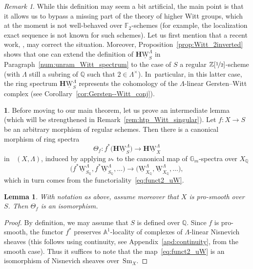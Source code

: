 \documentclass[11pt]{article}
\numberwithin{equation}{section}\renewcommand{\encodingdefault}{TU}
\renewcommand{\AA}{\mathbb A}
\newcommand{\uW}{\underline{\mathrm W}}
\newcommand{\HuW}{\mathbf H \underline{\mathrm W}}
\newcommand{\sm}{\mathrm{Sm}}
\DeclareMathOperator{\DA}{D_{\AA^1}}
\newcommand{\ZZot} {\mathbb Z[\nicefrac 1 2]}
\newcommand{\QQ} {\mathbb Q}
\newcommand{\GG} {\mathbb{G}_m}
\newtheorem{lm}[thm]{Lemma}
\theoremstyle{remark}
\newtheorem{rem}[thm]{Remark}
\theoremstyle{definition}
\newtheorem{num}[thm]{}
\numberwithin{equation}{thm}
\begin{document}
\begin{rem}\label{rem:justif_df_uW}
While this definition may seem a bit artificial, the main point is that it allows us to bypass a missing part of the theory of higher Witt groups,
which at the moment is not well-behaved over $\mathbb F_2$-schemes
(for example, the localization exact sequence is not known for such schemes).
Let us first mention that a recent work, \cite{realK1,realK2,realK3}, may correct the situation.
Moreover, Proposition~\ref{prop:Witt_2inverted} shows that
one can extend the definition of $\HuW_S^\Lambda$ in Paragraph~\ref{num:unram_Witt_spectrum}
to the case of $S$ a regular $\ZZot$-scheme (with $\Lambda$ still a subring of $\QQ$ such that $2 \in \Lambda^\times$).
In~particular, in this latter case, the ring spectrum $\HuW_S^\Lambda$
represents the cohomology of the $\Lambda$-linear Gersten--Witt complex
(see Corollary~\ref{cor:Gersten--Witt_conj}).
\end{rem}

\begin{num}
Before moving to our main theorem, let us prove an intermediate lemma
(which will be strengthened in Remark~\ref{rem:htp_Witt_singular}).
Let $f:X \to S$ be an arbitrary morphism of regular schemes.
Then there is a canonical morphism of ring spectra
\[
\Theta_f:f^*\big(\HuW^\Lambda_S\big) \to \HuW^\Lambda_X
\]
in $\DA(X,\Lambda)$, induced by applying $\nu_*$ to the canonical map of $\GG$-spectra over $X_\QQ$
\[
\big(f^*\uW^\Lambda_{S_\QQ},f^*\uW^\Lambda_{S_\QQ},\hdots\big)
\to \big(\uW^\Lambda_{X_\QQ},\uW^\Lambda_{X_\QQ},\hdots\big),
\]
which in turn comes from the functoriality~\eqref{eq:funct2_uW}.
\end{num}
\begin{lm}\label{lm:W commutes with p^*}
With notation as above, assume moreover that $X$ is pro-smooth over~$S$.
Then $\Theta_f$ is an isomorphism.
\end{lm}
\begin{proof}
By definition, we may assume that $S$ is defined over $\QQ$.
Since $f$ is pro-smooth, the functor $f^*$ preserves $\AA^1$-locality of complexes of $\Lambda$-linear Nisnevich sheaves (this follows using continuity, see Appendix~\ref{apd:continuity}, from the smooth case).
Thus it suffices to note that the map~\eqref{eq:funct2_uW} is an isomorphism
of Nisnevich sheaves over~$\sm_X$.
\end{proof}
\end{document}
